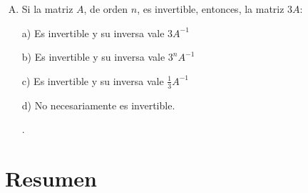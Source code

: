 \begin{enumerate}[Q. 1]
\item Si la matriz $A$, de orden $n$, es invertible, entonces, la matriz $3A$:

\begin{multicols}{2}
\hspace{-11mm} \small{a) Es invertible y su inversa vale $3A^{-1}$}

\hspace{-11mm} \small{b) Es invertible y su inversa vale $3^n A^{-1}$}

\hspace{-6mm} \small{c) Es invertible y su inversa vale $\frac 1 3 A^{-1}$}

\hspace{-5mm}\small{d) No necesariamente es invertible.}
\end{multicols}

.





	
\end{enumerate}

\clearpage

\section{Resumen}

